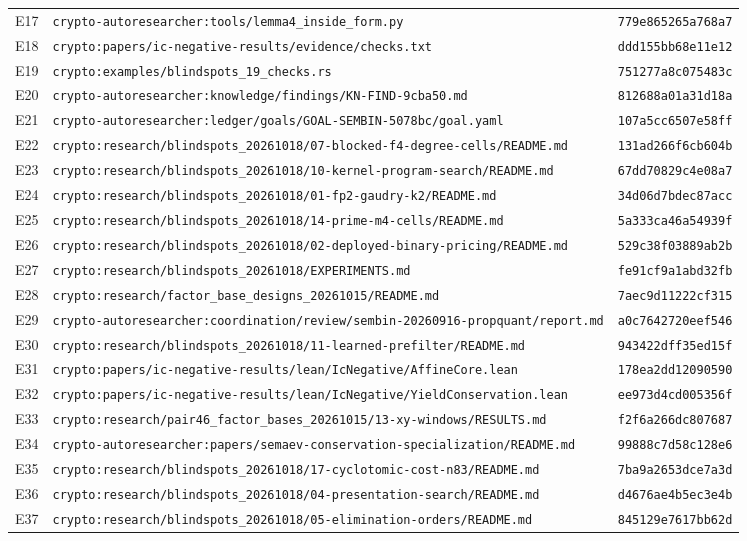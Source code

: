\begin{longtable}{@{}l p{10.6cm} l@{}}
E17 & \nolinkurl{crypto-autoresearcher:tools/lemma4_inside_form.py} & \texttt{779e865265a768a7} \\
E18 & \nolinkurl{crypto:papers/ic-negative-results/evidence/checks.txt} & \texttt{ddd155bb68e11e12} \\
E19 & \nolinkurl{crypto:examples/blindspots_19_checks.rs} & \texttt{751277a8c075483c} \\
E20 & \nolinkurl{crypto-autoresearcher:knowledge/findings/KN-FIND-9cba50.md} & \texttt{812688a01a31d18a} \\
E21 & \nolinkurl{crypto-autoresearcher:ledger/goals/GOAL-SEMBIN-5078bc/goal.yaml} & \texttt{107a5cc6507e58ff} \\
E22 & \nolinkurl{crypto:research/blindspots_20261018/07-blocked-f4-degree-cells/README.md} & \texttt{131ad266f6cb604b} \\
E23 & \nolinkurl{crypto:research/blindspots_20261018/10-kernel-program-search/README.md} & \texttt{67dd70829c4e08a7} \\
E24 & \nolinkurl{crypto:research/blindspots_20261018/01-fp2-gaudry-k2/README.md} & \texttt{34d06d7bdec87acc} \\
E25 & \nolinkurl{crypto:research/blindspots_20261018/14-prime-m4-cells/README.md} & \texttt{5a333ca46a54939f} \\
E26 & \nolinkurl{crypto:research/blindspots_20261018/02-deployed-binary-pricing/README.md} & \texttt{529c38f03889ab2b} \\
E27 & \nolinkurl{crypto:research/blindspots_20261018/EXPERIMENTS.md} & \texttt{fe91cf9a1abd32fb} \\
E28 & \nolinkurl{crypto:research/factor_base_designs_20261015/README.md} & \texttt{7aec9d11222cf315} \\
E29 & \nolinkurl{crypto-autoresearcher:coordination/review/sembin-20260916-propquant/report.md} & \texttt{a0c7642720eef546} \\
E30 & \nolinkurl{crypto:research/blindspots_20261018/11-learned-prefilter/README.md} & \texttt{943422dff35ed15f} \\
E31 & \nolinkurl{crypto:papers/ic-negative-results/lean/IcNegative/AffineCore.lean} & \texttt{178ea2dd12090590} \\
E32 & \nolinkurl{crypto:papers/ic-negative-results/lean/IcNegative/YieldConservation.lean} & \texttt{ee973d4cd005356f} \\
E33 & \nolinkurl{crypto:research/pair46_factor_bases_20261015/13-xy-windows/RESULTS.md} & \texttt{f2f6a266dc807687} \\
E34 & \nolinkurl{crypto-autoresearcher:papers/semaev-conservation-specialization/README.md} & \texttt{99888c7d58c128e6} \\
E35 & \nolinkurl{crypto:research/blindspots_20261018/17-cyclotomic-cost-n83/README.md} & \texttt{7ba9a2653dce7a3d} \\
E36 & \nolinkurl{crypto:research/blindspots_20261018/04-presentation-search/README.md} & \texttt{d4676ae4b5ec3e4b} \\
E37 & \nolinkurl{crypto:research/blindspots_20261018/05-elimination-orders/README.md} & \texttt{845129e7617bb62d} \\
\bottomrule
\end{longtable}
